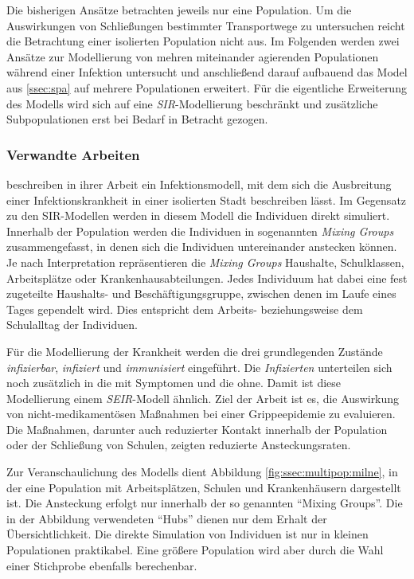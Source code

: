 Die bisherigen Ansätze betrachten jeweils nur eine Population. Um die Auswirkungen von Schließungen bestimmter Transportwege zu untersuchen reicht die Betrachtung einer isolierten Population nicht aus. Im Folgenden werden zwei Ansätze zur Modellierung von mehren miteinander agierenden Populationen während einer Infektion untersucht und anschließend darauf aufbauend das Model aus \ref{ssec:spa} auf mehrere Populationen erweitert. Für die eigentliche Erweiterung des Modells wird sich auf eine \emph{SIR}-Modellierung beschränkt und zusätzliche Subpopulationen erst bei Bedarf in Betracht gezogen.
\subsubsection{Verwandte Arbeiten}
\cite{Milne2008} beschreiben in ihrer Arbeit ein Infektionsmodell, mit dem sich die Ausbreitung einer Infektionskrankheit in einer isolierten Stadt beschreiben lässt. Im Gegensatz zu den SIR-Modellen werden in diesem Modell die Individuen direkt simuliert. Innerhalb der Population werden die Individuen in sogenannten \emph{Mixing Groups} zusammengefasst, in denen sich die Individuen untereinander anstecken können. Je nach Interpretation repräsentieren die \emph{Mixing Groups} Haushalte, Schulklassen, Arbeitsplätze oder Krankenhausabteilungen. Jedes Individuum hat dabei eine fest zugeteilte Haushalts- und Beschäftigungsgruppe, zwischen denen im Laufe eines Tages gependelt wird. Dies entspricht dem Arbeits- beziehungsweise dem Schulalltag der Individuen.

Für die Modellierung der Krankheit werden die drei grundlegenden Zustände \emph{infizierbar}, \emph{infiziert} und \emph{immunisiert} eingeführt. Die \emph{Infizierten} unterteilen sich noch zusätzlich in die mit Symptomen und die ohne. Damit ist diese Modellierung einem \emph{SEIR}-Modell ähnlich. Ziel der Arbeit ist es, die Auswirkung von nicht-medikamentösen Maßnahmen bei einer Grippeepidemie zu evaluieren. Die Maßnahmen, darunter auch reduzierter Kontakt innerhalb der Population oder der Schließung von Schulen, zeigten reduzierte Ansteckungsraten.

Zur Veranschaulichung des Modells dient Abbildung \ref{fig:ssec:multipop:milne}, in der eine Population mit Arbeitsplätzen, Schulen und Krankenhäusern dargestellt ist. Die Ansteckung erfolgt nur innerhalb der so genannten ``Mixing Groups''. Die in der Abbildung verwendeten ``Hubs'' dienen nur dem Erhalt der Übersichtlichkeit. Die direkte Simulation von Individuen ist nur in kleinen Populationen praktikabel. Eine größere Population wird aber durch die Wahl einer Stichprobe ebenfalls berechenbar.

